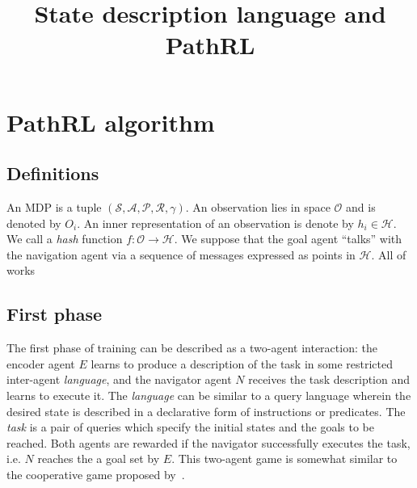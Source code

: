 \documentclass[acmsmall, nonacm]{acmart}
\title{State description language and PathRL}
\newcommand{\attn}[1]{{\color{magenta}{\textbf{#1}}}}
\begin{document}
\maketitle

\section{PathRL algorithm}

\subsection{Definitions}

An MDP is a tuple $(\mathcal{S}, \mathcal{A}, \mathcal{P}, \mathcal{R}, \gamma)$. An observation lies in space $\mathcal{O}$ and is denoted by $O_i$. An inner representation of an observation is denote by $h_i \in \mathcal{H}$. We call a \emph{hash} \attn{representation} function $
f: \mathcal{O} \rightarrow \mathcal{H}
$. We suppose that the goal agent ``talks'' with the navigation agent via a sequence of messages expressed as points in $\mathcal{H}$. All of works 


\subsection{First phase}

The first phase of training can be described as a two-agent interaction: the encoder agent $E$ learns to produce a description of the task in some restricted inter-agent \emph{language}, and the navigator agent $N$ receives the task description and learns to execute it.
%
The \emph{language} can be similar to a query language wherein the desired state is described in a declarative form of instructions or predicates. The \emph{task} is a pair of queries which specify the initial states and the goals to be reached.
%
Both agents are rewarded if the navigator successfully executes the task, i.e. $N$ reaches the a goal set by $E$.
This two-agent game is somewhat similar to the cooperative game proposed by~\citet{Mordatch2018EmergenceOG}.
\end{document}
